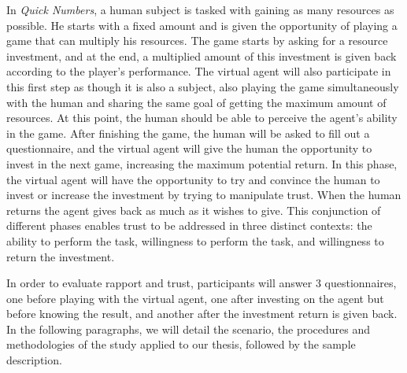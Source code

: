 In \emph{Quick Numbers}, a human subject is tasked with gaining as many resources as possible. He starts with a fixed amount and is given the opportunity of playing a game that can multiply his resources. The game starts by asking for a resource investment, and at the end, a multiplied amount of this investment is given back according to the player's performance. The virtual agent will also participate in this first step as though it is also a subject, also playing the game simultaneously with the human and sharing the same goal of getting the maximum amount of resources. At this point, the human should be able to perceive the agent's ability in the game. After finishing the game, the human will be asked to fill out a questionnaire, and the virtual agent will give the human the opportunity to invest in the next game, increasing the maximum potential return. In this phase, the virtual agent will have the opportunity to try and convince the human to invest or increase the investment by trying to manipulate trust. When the human returns the agent gives back as much as it wishes to give. This conjunction of different phases enables trust to be addressed in three distinct contexts: the ability to perform the task, willingness to perform the task, and willingness to return the investment.

In order to evaluate rapport and trust, participants will answer 3 questionnaires, one before playing with the virtual agent, one after investing on the agent but before knowing the result, and another after the investment return is given back. In the following paragraphs, we will detail the scenario, the procedures and methodologies of the study applied to our thesis, followed by the sample description.

